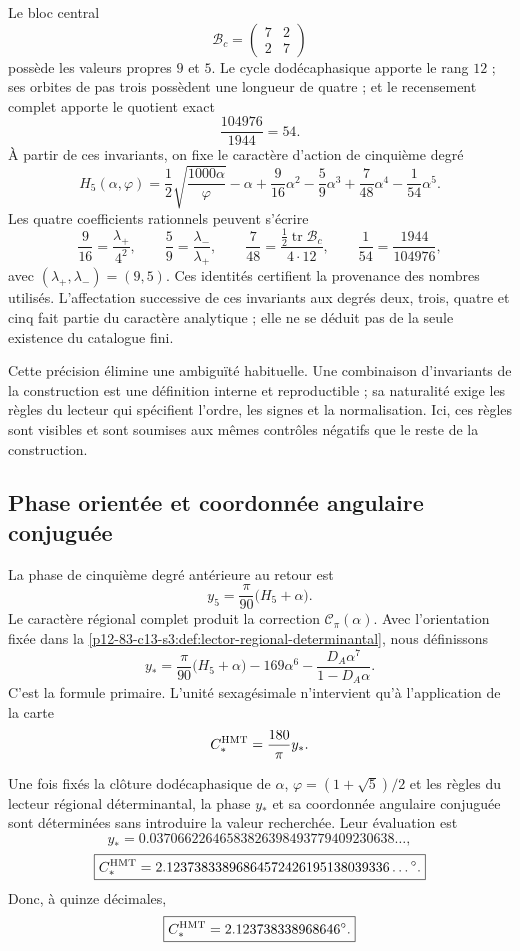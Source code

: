Le bloc central
\[
\mathcal B_c=\begin{pmatrix}7&2\\2&7\end{pmatrix}
\]
possède les valeurs propres \(9\) et \(5\). Le cycle dodécaphasique apporte le rang
\(12\) ; ses orbites de pas trois possèdent une longueur de quatre ; et le recensement complet
apporte le quotient exact
\[
\frac{104976}{1944}=54.
\]
À partir de ces invariants, on fixe le caractère d'action de cinquième degré
\[
\boxed{
H_5(\alpha,\varphi)
=\frac12\sqrt{\frac{1000\alpha}{\varphi}}-\alpha
+\frac9{16}\alpha^2-\frac59\alpha^3
+\frac7{48}\alpha^4-\frac1{54}\alpha^5.}
\]
Les quatre coefficients rationnels peuvent s'écrire
\[
\frac9{16}=\frac{\lambda_+}{4^2},
\qquad
\frac59=\frac{\lambda_-}{\lambda_+},
\qquad
\frac7{48}=\frac{\tfrac12\operatorname{tr}\mathcal B_c}{4\cdot12},
\qquad
\frac1{54}=\frac{1944}{104976},
\]
avec \((\lambda_+,\lambda_-)=(9,5)\). Ces identités certifient la
provenance des nombres utilisés. L'affectation successive de ces
invariants aux degrés deux, trois, quatre et cinq fait partie du caractère
analytique ; elle ne se déduit pas de la seule existence du catalogue fini.

Cette précision élimine une ambiguïté habituelle. Une combinaison
d'invariants de la construction est une définition interne et reproductible ; sa
naturalité exige les règles du lecteur qui spécifient l'ordre, les signes et la
normalisation. Ici, ces règles sont visibles et sont soumises aux mêmes
contrôles négatifs que le reste de la construction.

\subsection{Phase orientée et coordonnée angulaire conjuguée}

La phase de cinquième degré antérieure au retour est
\[
y_5=\frac\pi{90}\bigl(H_5+\alpha\bigr).
\]
Le caractère régional complet produit la correction
\(\mathscr C_\pi(\alpha)\). Avec l'orientation fixée dans la
\cref{p12-83-c13-s3:def:lector-regional-determinantal}, nous définissons
\[
\boxed{
y_*=\frac\pi{90}\bigl(H_5+\alpha\bigr)
-169\alpha^6
-\frac{D_A\alpha^7}{1-D_A\alpha}.}
\]
C'est la formule primaire. L'unité sexagésimale n'intervient qu'à l'application de la carte
\[
C_*^{\rm HMT}=\frac{180}{\pi}y_*.
\]

\begin{theorem}
\label{p12-83-c13-s3:thm:contraangulo-regional}
Une fois fixés la clôture dodécaphasique de \(\alpha\),
\(\varphi=(1+\sqrt5)/2\) et les règles du lecteur régional déterminantal, la
phase \(y_*\) et sa coordonnée angulaire conjuguée sont déterminées sans introduire la valeur
recherchée. Leur évaluation est
\[
\boxed{
y_*=0.03706622646583826398493779409230638\ldots,}
\]
\[
\boxed{
C_*^{\rm HMT}
=2.12373833896864572426195138039336\ldots{}^\circ.}
\]
Donc, à quinze décimales,
\[
\boxed{C_*^{\rm HMT}=2.123738338968646^\circ.}
\]
\end{theorem}

